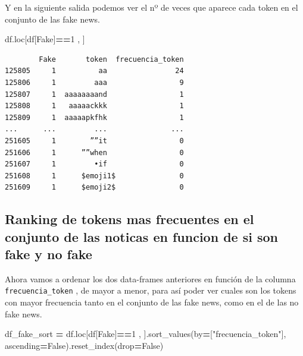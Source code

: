 \documentclass[
  11pt,
  a4paper,
]{article}
\newenvironment{Shaded}{\begin{snugshade}}{\end{snugshade}}
\newcommand{\DecValTok}[1]{\textcolor[rgb]{0.00,0.00,0.81}{#1}}
\newcommand{\NormalTok}[1]{#1}
\newcommand{\OperatorTok}[1]{\textcolor[rgb]{0.81,0.36,0.00}{\textbf{#1}}}
\newcommand{\StringTok}[1]{\textcolor[rgb]{0.31,0.60,0.02}{#1}}
\newcommand{\VariableTok}[1]{\textcolor[rgb]{0.00,0.00,0.00}{#1}}
\begin{document}
Y en la siguiente salida podemos ver el nº de veces que aparece cada
token en el conjunto de las fake news.

\begin{Shaded}
\begin{Highlighting}[]
\NormalTok{df.loc[df[}\StringTok{\textquotesingle{}Fake\textquotesingle{}}\NormalTok{]}\OperatorTok{==}\DecValTok{1}\NormalTok{ , ] }
\end{Highlighting}
\end{Shaded}

\begin{verbatim}
        Fake       token  frecuencia_token
125805     1          aa                24
125806     1         aaa                 9
125807     1  aaaaaaaand                 1
125808     1   aaaaackkk                 1
125809     1  aaaaapkfhk                 1
...      ...         ...               ...
251605     1        ””it                 0
251606     1      ””when                 0
251607     1         •if                 0
251608     1      $emoji1$               0
251609     1      $emoji2$               0
\end{verbatim}

\hypertarget{ranking-de-tokens-mas-frecuentes-en-el-conjunto-de-las-noticas-en-funcion-de-si-son-fake-y-no-fake}{%
\subsection{Ranking de tokens mas frecuentes en el conjunto de las
noticas en funcion de si son fake y no
fake}\label{ranking-de-tokens-mas-frecuentes-en-el-conjunto-de-las-noticas-en-funcion-de-si-son-fake-y-no-fake}}

Ahora vamos a ordenar los dos data-frames anteriores en función de la
columna \texttt{frecuencia\_token} , de mayor a menor, para así poder
ver cuales son los tokens con mayor frecuencia tanto en el conjunto de
las fake news, como en el de las no fake news.

\begin{Shaded}
\begin{Highlighting}[]
\NormalTok{df\_fake\_sort }\OperatorTok{=}\NormalTok{ df.loc[df[}\StringTok{\textquotesingle{}Fake\textquotesingle{}}\NormalTok{]}\OperatorTok{==}\DecValTok{1}\NormalTok{ , ].sort\_values(by}\OperatorTok{=}\NormalTok{[}\StringTok{"frecuencia\_token"}\NormalTok{], ascending}\OperatorTok{=}\VariableTok{False}\NormalTok{).reset\_index(drop}\OperatorTok{=}\VariableTok{False}\NormalTok{)}
\end{Highlighting}
\end{Shaded}
\end{document}
